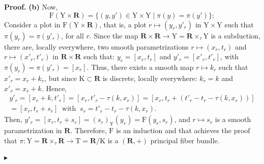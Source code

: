 \documentclass[10pt,letterpaper,reqno]{amsart}
\theoremstyle{article}
\renewenvironment{proof}{\noindent \textbf{Proof.}} {\nolinebreak $\blacktriangleright$}
\newcommand{\1}{{\hat 1}}
\newcommand{\0}{{\hat 0}}
\newcommand{\RR}{\mathbf R}
\def \F{\mathrm F}
\def \K{\mathrm K}
\def \T{\mathrm T}
\def \Y{\mathrm Y}
\newcommand{\cl}[1]{\left[ #1 \right]}
\newcommand{\Ka}{\K}
\begin{document}
\begin{proof}
    \textbf{(b)} Now,
    $$
      \F(\Y \times \RR) = \{(y,y') \in \Y \times \Y \mid \pi(y) = \pi(y') \};
      $$
    Consider a plot in $\F(\Y \times \RR)$,
    that is,
    a plot $r \mapsto (y_r,y'_r)$ in $\Y \times \Y$ such that $\pi(y_r) = \pi(y'_r)$,
    for all $r$.
    Since the map $\RR \times \RR \to \Y = \RR \times_\tau \Y$ is a subduction,
    there are,
    locally everywhere,
    two smooth parametrizations $r \mapsto (x_r,t_r)$ and $r \mapsto (x'_r,t'_r)$ in $\RR \times \RR$ such that:
    $y_r = \cl{x_r,t_r}$ and $y'_r = \cl{x'_r,t'_r}$, with $\pi(y_r) = \pi(y'_r) = \cl{x_r}$.
    Thus,
    there exists a smooth map $r \mapsto k_r$ such that $x'_r = x_r + k_r$,
    but since $\Ka \subset \RR$ is discrete,
    locally everywhere:
    $k_r = k$ and $x'_r = x_r + k$.
    Hence,
    \begin{multline*}
      y'_r = \cl{x_r + k,t'_r} = \cl{x_r, t'_r - \tau(k,x_r)} =  \cl{x_r, t_r + (t'_r -t_r - \tau(k,x_r))} \\
      = \cl{x_r, t_r + s_r} \ \text{ with } \ s_r = t'_r -t_r - \tau(k,x_r).
    \end{multline*}
    Then,
    $y'_r = \cl{x_r, t_r + s_r} = (s_r)_\Y(y_r) = \F(y_r,s_r)$,
    and $r \mapsto s_r$ is a smooth parametrization in $\RR$.
    Therefore,
    $\F$ is an induction and that achieves the proof that $\pi : \Y = \RR \times_\tau \RR \to \T = \RR/\Ka$ is a $(\RR,+)$ principal fiber bundle.
    

\end{proof}
\end{document}
